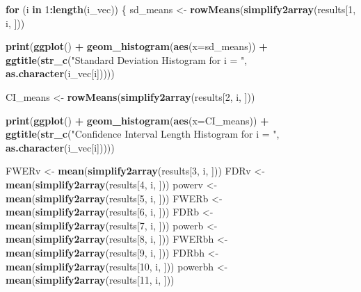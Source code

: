 \documentclass[
]{article}
\newenvironment{Shaded}{\begin{snugshade}}{\end{snugshade}}
\newcommand{\ControlFlowTok}[1]{\textcolor[rgb]{0.13,0.29,0.53}{\textbf{#1}}}
\newcommand{\DataTypeTok}[1]{\textcolor[rgb]{0.13,0.29,0.53}{#1}}
\newcommand{\DecValTok}[1]{\textcolor[rgb]{0.00,0.00,0.81}{#1}}
\newcommand{\KeywordTok}[1]{\textcolor[rgb]{0.13,0.29,0.53}{\textbf{#1}}}
\newcommand{\NormalTok}[1]{#1}
\newcommand{\OperatorTok}[1]{\textcolor[rgb]{0.81,0.36,0.00}{\textbf{#1}}}
\newcommand{\StringTok}[1]{\textcolor[rgb]{0.31,0.60,0.02}{#1}}
\begin{document}
\begin{Shaded}
\begin{Highlighting}[]
{\ControlFlowTok{for}\NormalTok{ (i }\ControlFlowTok{in} \DecValTok{1}\OperatorTok{:}\KeywordTok{length}\NormalTok{(i_vec)) \{}
\NormalTok{  sd_means <-}\StringTok{ }\KeywordTok{rowMeans}\NormalTok{(}\KeywordTok{simplify2array}\NormalTok{(results[}\DecValTok{1}\NormalTok{, i, ]))}
  
  \KeywordTok{print}\NormalTok{(}\KeywordTok{ggplot}\NormalTok{() }\OperatorTok{+}\StringTok{ }
\StringTok{    }\KeywordTok{geom_histogram}\NormalTok{(}\KeywordTok{aes}\NormalTok{(}\DataTypeTok{x=}\NormalTok{sd_means)) }\OperatorTok{+}\StringTok{ }
\StringTok{      }\KeywordTok{ggtitle}\NormalTok{(}\KeywordTok{str_c}\NormalTok{(}\StringTok{"Standard Deviation Histogram for i = "}\NormalTok{,}
                    \KeywordTok{as.character}\NormalTok{(i_vec[i]))))}
    
\NormalTok{  CI_means <-}\StringTok{ }\KeywordTok{rowMeans}\NormalTok{(}\KeywordTok{simplify2array}\NormalTok{(results[}\DecValTok{2}\NormalTok{, i, ]))}
  
  \KeywordTok{print}\NormalTok{(}\KeywordTok{ggplot}\NormalTok{() }\OperatorTok{+}
\StringTok{    }\KeywordTok{geom_histogram}\NormalTok{(}\KeywordTok{aes}\NormalTok{(}\DataTypeTok{x=}\NormalTok{CI_means)) }\OperatorTok{+}
\StringTok{      }\KeywordTok{ggtitle}\NormalTok{(}\KeywordTok{str_c}\NormalTok{(}\StringTok{"Confidence Interval Length Histogram for i = "}\NormalTok{,  }
                    \KeywordTok{as.character}\NormalTok{(i_vec[i])))) }
  
\NormalTok{  FWERv <-}\StringTok{ }\KeywordTok{mean}\NormalTok{(}\KeywordTok{simplify2array}\NormalTok{(results[}\DecValTok{3}\NormalTok{,  i, ]))}
\NormalTok{  FDRv <-}\StringTok{ }\KeywordTok{mean}\NormalTok{(}\KeywordTok{simplify2array}\NormalTok{(results[}\DecValTok{4}\NormalTok{,  i, ]))}
\NormalTok{  powerv <-}\StringTok{ }\KeywordTok{mean}\NormalTok{(}\KeywordTok{simplify2array}\NormalTok{(results[}\DecValTok{5}\NormalTok{,  i, ]))}
\NormalTok{  FWERb <-}\StringTok{ }\KeywordTok{mean}\NormalTok{(}\KeywordTok{simplify2array}\NormalTok{(results[}\DecValTok{6}\NormalTok{,  i, ]))}
\NormalTok{  FDRb <-}\StringTok{ }\KeywordTok{mean}\NormalTok{(}\KeywordTok{simplify2array}\NormalTok{(results[}\DecValTok{7}\NormalTok{,  i, ]))}
\NormalTok{  powerb <-}\StringTok{ }\KeywordTok{mean}\NormalTok{(}\KeywordTok{simplify2array}\NormalTok{(results[}\DecValTok{8}\NormalTok{,  i, ]))}
\NormalTok{  FWERbh <-}\StringTok{ }\KeywordTok{mean}\NormalTok{(}\KeywordTok{simplify2array}\NormalTok{(results[}\DecValTok{9}\NormalTok{,  i, ]))}
\NormalTok{  FDRbh <-}\StringTok{ }\KeywordTok{mean}\NormalTok{(}\KeywordTok{simplify2array}\NormalTok{(results[}\DecValTok{10}\NormalTok{,  i, ]))}
\NormalTok{  powerbh <-}\StringTok{ }\KeywordTok{mean}\NormalTok{(}\KeywordTok{simplify2array}\NormalTok{(results[}\DecValTok{11}\NormalTok{,  i, ]))}
  
}
\end{Highlighting}
\end{Shaded}
\end{document}
